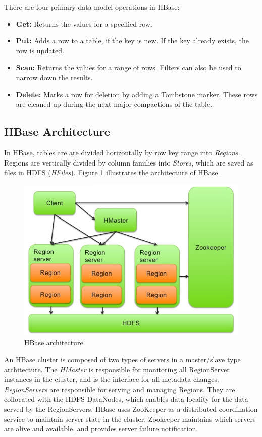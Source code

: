 There are four primary data model operations in HBase:
\begin{itemize}
\item \textbf{Get:} Returns the values for a specified row.
\item \textbf{Put:} Adds a row to a table, if the key is new. If the key already exists, the row is updated.
\item \textbf{Scan:} Returns the values for a range of rows. Filters can also be used to narrow down the results.
\item \textbf{Delete:} Marks a row for deletion by adding a Tombstone marker. These rows are cleaned up during the next major compactions of the table.
\end{itemize}

\subsection{HBase Architecture}

In HBase, tables are are divided horizontally by row key range into \emph{Regions}. Regions are vertically divided by column families into \emph{Stores}, which are saved as files in HDFS (\emph{HFiles}). Figure \ref{figure:hbase_architecture} illustrates the architecture of HBase.

\begin{figure}[H]
\centering
\includegraphics{figures/hbase_architecture}
\caption{HBase architecture}
\label{figure:hbase_architecture}
\end{figure}

An HBase cluster is composed of two types of servers in a master/slave type architecture. The \emph{HMaster} is responsible for monitoring all RegionServer instances in the cluster, and is the interface for all metadata changes. \emph{RegionServers} are responsible for serving and managing Regions. They are collocated with the HDFS DataNodes, which enables data locality for the data served by the RegionServers. HBase uses ZooKeeper as a distributed coordination service to maintain server state in the cluster. Zookeeper maintains which servers are alive and available, and provides server failure notification.

